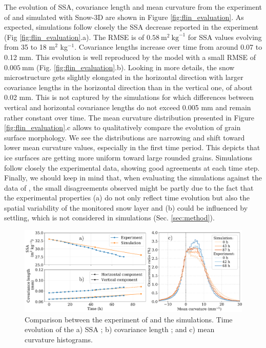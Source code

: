 \documentclass[draft,ms]{agujournal2019}
\begin{document}
The evolution of SSA, covariance length and mean curvature from the experiment of  and simulated with Snow-3D are shown in Figure \ref{fig:flin_evaluation}. As expected, simulations follow closely the SSA decrease reported in the experiment (Fig \ref{fig:flin_evaluation}.a).
The RMSE is of $0.58\ \mathrm{m}^2\ \mathrm{kg}^{-1}$ for SSA values evolving from 35 to 18 m$^2$ kg$^{-1}$.
Covariance lengths increase over time from around 0.07 to 0.12 mm. This evolution is well reproduced by the model with a small RMSE of $0.005\ \mathrm{mm}$ (Fig. \ref{fig:flin_evaluation}.b). Looking in more details, the snow microstructure gets slightly elongated in the horizontal direction with larger covariance lengths in the horizontal direction than in the vertical one, of about 0.02 mm. This is not captured by the simulations for which differences between vertical and horizontal covariance lengths do not exceed 0.005 mm and remain rather constant over time. 
The mean curvature distribution presented in Figure \ref{fig:flin_evaluation}.c allows to qualitatively compare the evolution of grain surface morphology. We see the distributions are narrowing and shift toward lower mean curvature values, especially in the first time period. This depicts that ice surfaces are getting more uniform toward large rounded grains. Simulations follow closely the experimental data, showing good agreements at each time step. Finally, we should keep in mind that, when evaluating the simulations against the data of , the small disagreements observed might be partly due to the fact that the experimental properties (a) do not only reflect time evolution but also the spatial variability of the monitored snow layer and (b) could be influenced by settling, which is not considered in simulations (Sec. \ref{sec:method}).\\

\begin{figure}
    \centering
    \includegraphics[width=\linewidth]{Figures/microstruct_EBONI_exp_simu.pdf}
    \caption{Comparison between the experiment of \protect{} and the simulations. Time evolution of the a) SSA ; b) covariance length ; and c) mean curvature histograms.}
    \label{fig:eboni}
\end{figure}
\end{document}
